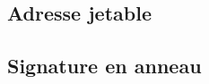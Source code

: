 \begin{comment}
\subsection{Mixeur}


\subsection{Le routeur en oignon (\acrshort{tor})}


\subsection{Réseau virtuel privé (\acrshort{vpn})}
 
Un \acrshort{vpn} permet de sécuriser la couche \acrshort{tcp}/\acrshort{ip}. 
Plus précisément, un \acrshort{vpn} \acrshort{ssl} sécurise la couche 
\acrshort{tcp} tandis qu'un \acrshort{vpn} \acrshort{ipsec} sécurise la couche \acrshort{ip}.\\ 
Un \acrshort{vpn} \acrshort{ssl} crée une connexion \acrshort{tcp} entre un client et un serveur 
sécurisée par le protocole \acrshort{ssl}.\\ 
Cependant, les adresses \acrshort{ip} du client et du serveur ne sont pas offusquées car la 
couche \acrshort{ip} n'est pas prise en compte. Un \acrshort{vpn} \acrshort{ipsec} sécurise lui 
la couche \acrshort{ip}, il existe 2 modes : transport et tunnel. Le mode transport ne protège 
que la charge utile du paquet \acrshort{ip}, et non l'en-tête. Le mode tunnel protège à la fois la charge 
utile et l'en-tête du paquet \acrshort{ip}. Une nouvelle en-tête \acrshort{ip} est créée, l'en-tête
\acrshort{ip} originale est chiffrée.\\
Parmi ces 3 techniques, l'en-tête \acrshort{ip} originale est uniquement modifiée par
un \acrshort{vpn} \acrshort{ipsec} en mode tunnel.

\begin{figure}[h]
    \centering
    \texttt{[image: pics/ipsec.png]}
    \caption{Datagramme \acrshort{ipsec} mode \acrshort{esp}-tunnel}
\end{figure}

\begin{proposition}
    Un \acrshort{vpn} \acrshort{ipsec} en mode tunnel garantit un anonymat $\alpha_3$ 
    si la résolution suivante est difficile :\\ 
    $\Gamma \: := ip\_addr_{new} \mapsto ip\_addr_{original}$
\end{proposition}  
\end{comment}

\subsection{Adresse jetable}


\subsection{Signature en anneau}
